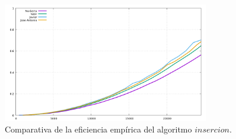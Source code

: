 \documentclass[11pt,a4paper]{article}
\begin{document}
\begin{figure}[H]
	\centering
	\includegraphics[width=0.8\textwidth]{../plots/insercion}
	\caption{Comparativa de la eficiencia empírica del algoritmo $insercion$.}
\end{figure}
\end{document}
